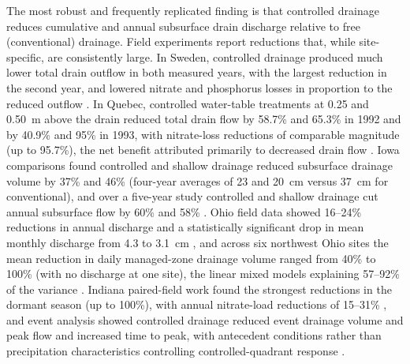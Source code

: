\documentclass[11pt]{article}
\begin{document}
The most robust and frequently replicated finding is that controlled drainage
reduces cumulative and annual subsurface drain discharge relative to free
(conventional) drainage. Field experiments report reductions that, while
site-specific, are consistently large. In Sweden, controlled drainage produced
much lower total drain outflow in both measured years, with the largest
reduction in the second year, and lowered nitrate and phosphorus losses in
proportion to the reduced outflow \parencite{Wesström2001,Wesström2007}. In
Quebec, controlled water-table treatments at 0.25 and 0.50~m above the drain
reduced total drain flow by 58.7\% and 65.3\% in 1992 and by 40.9\% and 95\% in
1993, with nitrate-loss reductions of comparable magnitude (up to 95.7\%), the
net benefit attributed primarily to decreased drain flow
\parencite{Lalonde1996}. Iowa comparisons found controlled and shallow drainage
reduced subsurface drainage volume by 37\% and 46\% (four-year averages of 23
and 20~cm versus 37~cm for conventional), and over a five-year study controlled
and shallow drainage cut annual subsurface flow by 60\% and 58\%
\parencite{Helmers2012,Schott2017}. Ohio field data showed 16--24\% reductions
in annual discharge and a statistically significant drop in mean monthly
discharge from 4.3 to 3.1~cm \parencite{Pease2017}, and across six northwest
Ohio sites the mean reduction in daily managed-zone drainage volume ranged from
40\% to 100\% (with no discharge at one site), the linear mixed models
explaining 57--92\% of the variance \parencite{Gunn2015}. Indiana paired-field
work found the strongest reductions in the dormant season (up to 100\%), with
annual nitrate-load reductions of 15--31\% \parencite{Adeuya2012}, and event
analysis showed controlled drainage reduced event drainage volume and peak flow
and increased time to peak, with antecedent conditions rather than precipitation
characteristics controlling controlled-quadrant response \parencite{Lahdou2019}.
\end{document}

